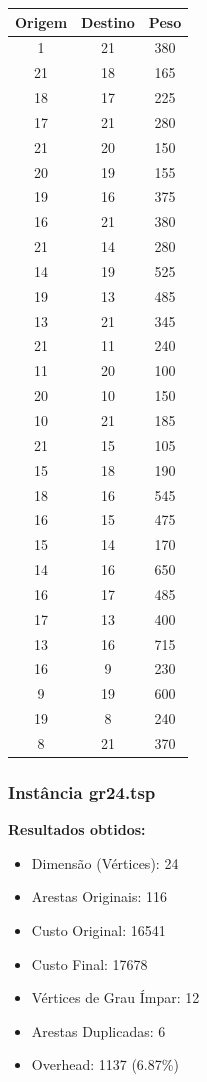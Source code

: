 \documentclass[12pt]{article}
\begin{document}
\begin{longtable}{|c|c|c|}
\hline Origem & Destino & Peso \\
\hline 1 & 21 & 380 \\
\hline 21 & 18 & 165 \\
\hline 18 & 17 & 225 \\
\hline 17 & 21 & 280 \\
\hline 21 & 20 & 150 \\
\hline 20 & 19 & 155 \\
\hline 19 & 16 & 375 \\
\hline 16 & 21 & 380 \\
\hline 21 & 14 & 280 \\
\hline 14 & 19 & 525 \\
\hline 19 & 13 & 485 \\
\hline 13 & 21 & 345 \\
\hline 21 & 11 & 240 \\
\hline 11 & 20 & 100 \\
\hline 20 & 10 & 150 \\
\hline 10 & 21 & 185 \\
\hline 21 & 15 & 105 \\
\hline 15 & 18 & 190 \\
\hline 18 & 16 & 545 \\
\hline 16 & 15 & 475 \\
\hline 15 & 14 & 170 \\
\hline 14 & 16 & 650 \\
\hline 16 & 17 & 485 \\
\hline 17 & 13 & 400 \\
\hline 13 & 16 & 715 \\
\hline 16 & 9 & 230 \\
\hline 9 & 19 & 600 \\
\hline 19 & 8 & 240 \\
\hline 8 & 21 & 370 \\
\hline\end{longtable}

\subsubsection{Instância gr24.tsp}

\textbf{Resultados obtidos:}
\begin{itemize}
    \item Dimensão (Vértices): 24
    \item Arestas Originais: 116
    \item Custo Original: 16541
    \item Custo Final: 17678
    \item Vértices de Grau Ímpar: 12
    \item Arestas Duplicadas: 6
    \item Overhead: 1137 (6.87\%)
\end{itemize}
\end{document}
